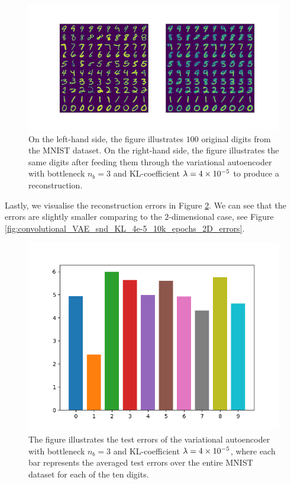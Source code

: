 \begin{figure}
\begin{center}
      \includegraphics[trim = 15mm 10mm 15mm 15mm, clip, width=\linewidth]{convolutional_VAE_snd_KL_4e-5_10k_epochs_3D_inference}
\end{center}
\caption{On the left-hand side, the figure illustrates $100$ original digits from the MNIST dataset. On the right-hand side, the figure illustrates the same digits after feeding them through the variational autoencoder with bottleneck $n_b=3$ and KL-coefficient $\lambda = \num{4e-5}$ to produce a reconstruction.}\label{fig:convolutional_VAE_snd_KL_4e-5_10k_epochs_3D_inference}
\end{figure}


Lastly, we visualise the reconstruction errors in Figure \ref{fig:convolutional_VAE_snd_KL_4e-5_10k_epochs_3D_errors}. We can see that the errors are slightly smaller comparing to the $2$-dimensional case, see Figure \ref{fig:convolutional_VAE_snd_KL_4e-5_10k_epochs_2D_errors}.



\begin{figure}
\begin{center}
      \includegraphics[width=0.55\linewidth]{convolutional_VAE_snd_KL_4e-5_10k_epochs_3D_errors}
\end{center}
\caption{The figure illustrates the test errors of the variational autoencoder with bottleneck $n_b=3$ and KL-coefficient $\lambda = \num{4e-5}$, where each bar represents the averaged test errors over the entire MNIST dataset for each of the ten digits.}\label{fig:convolutional_VAE_snd_KL_4e-5_10k_epochs_3D_errors}
\end{figure}


